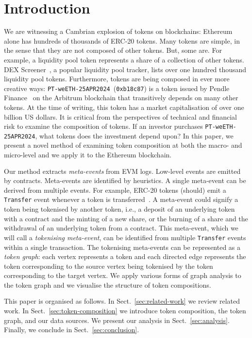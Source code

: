 \section{Introduction}\label{sec:introduction}

We are witnessing a Cambrian explosion of tokens on blockchains:
Ethereum alone has hundreds of thousands of ERC-20 tokens.  Many
tokens are simple, in the sense that they are not composed of other
tokens.  But, some are.  For example, a liquidity pool token
represents a share of a collection of other tokens.  DEX
Screener~\cite{dex-screener-xx}, a popular liquidity pool tracker,
lists over one hundred thousand liquidity pool tokens.  Furthermore,
tokens are being composed in ever more creative ways:
\texttt{PT-weETH-25APR2024}~(\texttt{0xb18c87}) is a token issued by
Pendle Finance~\cite{nguyen-vuong-22} on the Arbitrum blockchain that
transitively depends on many other tokens.  At the time of writing,
this token has a market capitalisation of over one billion US dollars.
It is critical from the perspectives of technical and financial risk
to examine the composition of tokens.  If an investor purchases
\texttt{PT-weETH-25APR2024}, what tokens does the investment depend
upon?  In this paper, we present a novel method of examining token
composition at both the macro- and micro-level and we apply it to the
Ethereum blockchain.


Our method extracts \textit{meta-events} from EVM logs.  Low-level
events are emitted by contracts.  Meta-events are identified by
heuristics.  A single meta-event can be derived from multiple events.
For example, ERC-20 tokens (should) emit a \texttt{Transfer} event
whenever a token is transferred~\cite{vogelsteller-buterin-15}.  A
meta-event could signify a token being tokenised by another token,
i.e., a deposit of an underlying token with a contract and the minting
of a new share, or the burning of a share and the withdrawal of an
underlying token from a contract.  This meta-event, which we will call
a \textit{tokenising meta-event}, can be identified from multiple
\texttt{Transfer} events within a single transaction.  The tokenising
meta-events can be represented as a \textit{token graph}: each vertex
represents a token and each directed edge represents the token
corresponding to the source vertex being tokenised by the token
corresponding to the target vertex.  We apply various forms of graph
analysis to the token graph and we visualise the structure of token
compositions.

This paper is organised as follows.  In Sect.~\ref{sec:related-work}
we review related work.  In Sect.~\ref{sec:token-composition} we
introduce token composition, the token graph, and our data sources.
We present our analysis in Sect.~\ref{sec:analysis}.  Finally, we
conclude in Sect.~\ref{sec:conclusion}.

